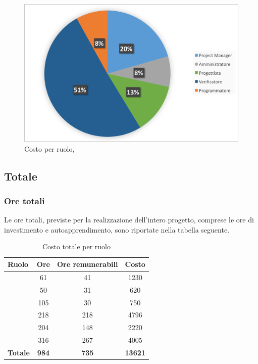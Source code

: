 \begin{figure}[H]
	\centering 
	\includegraphics[scale=0.7]{Immagini/GraficiTorteSezione6/VV.png}
	\caption{Costo per ruolo, \VV}
\end{figure}

\newpage
\subsection{Totale}
\subsubsection{Ore totali}
Le ore totali, previste per la realizzazione dell'intero progetto, comprese le ore di investimento e autoapprendimento, sono riportate nella tabella seguente.

\begin{table}[h]
	\begin{center}
		\begin{tabular}{|l|c|c|c|}
			\hline
			\textbf{Ruolo}	& \textbf{Ore} &	\textbf{Ore remunerabili}	 &\textbf{Costo} \\
			\hline
			\textit{\Pm}	&	61	&	41	&	1230	\\
			\hline
			\textit{\Am}	&	50	&	31	&	620	\\
			\hline
			\textit{\An}	&	105	&	30	&	750	\\
			\hline
			\textit{\Prog}	&	218	&	218	&	4796	\\
			\hline
			\textit{\Progr}	&	204	&	148	&	2220	\\
			\hline
			\textit{\Ver}	&	316	&	267	&	4005	\\
			\hline
			\textbf{Totale}	&	\textbf{984} & \textbf{735} & \textbf{13621}	\\
			\hline
		\end{tabular}
	\end{center}
	\caption{Costo totale per ruolo}
\end{table}

